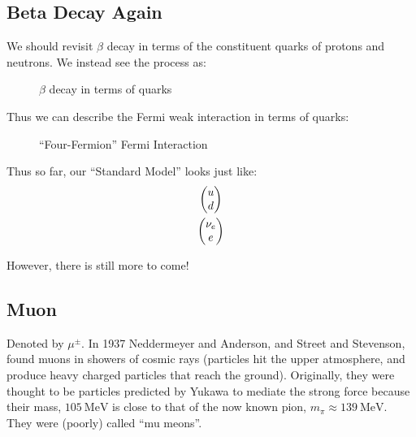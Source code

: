 \subsection{Beta Decay Again}
We should revisit $\beta$ decay in terms of the constituent quarks of protons and neutrons. We instead see the process as:
\begin{figure}[H]
  \centering
  \caption{$\beta$ decay in terms of quarks}
  \label{fig:beta}
\end{figure}
Thus we can describe the Fermi weak interaction in terms of quarks:
\begin{figure}[H]
  \centering
  \caption{``Four-Fermion'' Fermi Interaction}
  \label{fig:fermi}
\end{figure}

Thus so far, our ``Standard Model'' looks just like:
\begin{gather*}
  \pmqty{u\\d}\\
  \pmqty{\nu_e\\e}
\end{gather*}

However, there is still more to come!

\subsection{Muon}
Denoted by $\mu^\pm$. In 1937 Neddermeyer and Anderson, and Street and Stevenson, found muons in showers of cosmic rays (particles hit the upper atmosphere, and produce heavy charged particles that reach the ground). Originally, they were thought to be particles predicted by Yukawa to mediate the strong force because their mass, $\SI{105}{\mega\eV}$ is close to that of the now known pion, $m_\pi\approx\SI{139}{\mega\eV}$. They were (poorly) called ``mu meons''.

